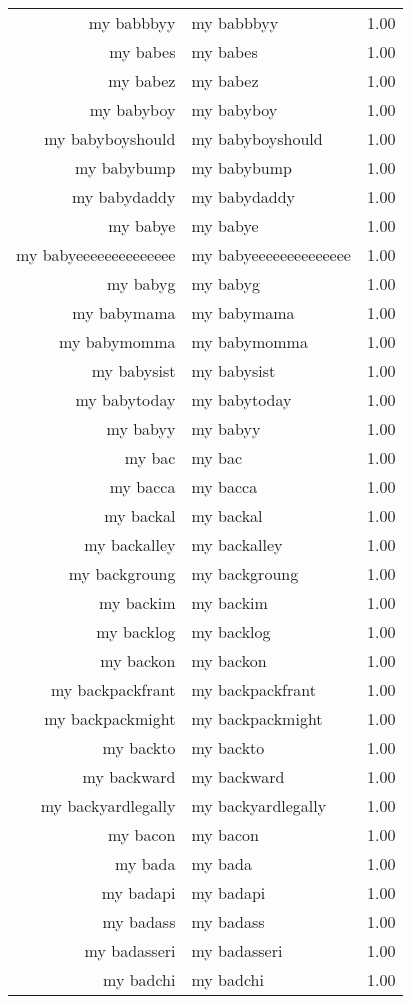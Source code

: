 \begin{table}[ht]
\begin{tabular}{rlr}
  my babbbyy & my babbbyy & 1.00 \\ 
  my babes & my babes & 1.00 \\ 
  my babez & my babez & 1.00 \\ 
  my babyboy & my babyboy & 1.00 \\ 
  my babyboyshould & my babyboyshould & 1.00 \\ 
  my babybump & my babybump & 1.00 \\ 
  my babydaddy & my babydaddy & 1.00 \\ 
  my babye & my babye & 1.00 \\ 
  my babyeeeeeeeeeeeeee & my babyeeeeeeeeeeeeee & 1.00 \\ 
  my babyg & my babyg & 1.00 \\ 
  my babymama & my babymama & 1.00 \\ 
  my babymomma & my babymomma & 1.00 \\ 
  my babysist & my babysist & 1.00 \\ 
  my babytoday & my babytoday & 1.00 \\ 
  my babyy & my babyy & 1.00 \\ 
  my bac & my bac & 1.00 \\ 
  my bacca & my bacca & 1.00 \\ 
  my backal & my backal & 1.00 \\ 
  my backalley & my backalley & 1.00 \\ 
  my backgroung & my backgroung & 1.00 \\ 
  my backim & my backim & 1.00 \\ 
  my backlog & my backlog & 1.00 \\ 
  my backon & my backon & 1.00 \\ 
  my backpackfrant & my backpackfrant & 1.00 \\ 
  my backpackmight & my backpackmight & 1.00 \\ 
  my backto & my backto & 1.00 \\ 
  my backward & my backward & 1.00 \\ 
  my backyardlegally & my backyardlegally & 1.00 \\ 
  my bacon & my bacon & 1.00 \\ 
  my bada & my bada & 1.00 \\ 
  my badapi & my badapi & 1.00 \\ 
  my badass & my badass & 1.00 \\ 
  my badasseri & my badasseri & 1.00 \\ 
  my badchi & my badchi & 1.00 \\ 

\end{tabular}
\end{table}
